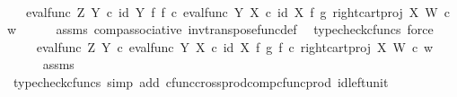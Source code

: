 \begin{isabellebody}
\ \ \isamarkupfalse%
\ \isamarkupfalse%
\ {\isachardoublequoteopen}{\isachardot}{\kern0pt}{\isachardot}{\kern0pt}{\isachardot}{\kern0pt}\ {\isacharequal}{\kern0pt}\ {\isacharparenleft}{\kern0pt}eval{\isacharunderscore}{\kern0pt}func\ Z\ Y\ {\isasymcirc}\isactrlsub c\ {\isacharparenleft}{\kern0pt}id\ Y\ {\isasymtimes}\isactrlsub f\ f{\isacharparenright}{\kern0pt}\ {\isasymcirc}\isactrlsub c\ {\isasymlangle}eval{\isacharunderscore}{\kern0pt}func\ Y\ X\ {\isasymcirc}\isactrlsub c\ {\isacharparenleft}{\kern0pt}id\ X\ {\isasymtimes}\isactrlsub f\ g{\isacharparenright}{\kern0pt}{\isacharcomma}{\kern0pt}\ right{\isacharunderscore}{\kern0pt}cart{\isacharunderscore}{\kern0pt}proj\ X\ W{\isasymrangle}{\isacharparenright}{\kern0pt}\isactrlsup {\isasymsharp}\ {\isasymcirc}\isactrlsub c\ w{\isachardoublequoteclose}\isanewline
\ \ \ \ \isamarkupfalse%
\ assms\ comp{\isacharunderscore}{\kern0pt}associative{}\ inv{\isacharunderscore}{\kern0pt}transpose{\isacharunderscore}{\kern0pt}func{\isacharunderscore}{\kern0pt}def{}\ \isamarkupfalse%
\ {\isacharparenleft}{\kern0pt}typecheck{\isacharunderscore}{\kern0pt}cfuncs{\isacharcomma}{\kern0pt}\ force{\isacharparenright}{\kern0pt}\isanewline
\ \ \isamarkupfalse%
\ \isamarkupfalse%
\ {\isachardoublequoteopen}{\isachardot}{\kern0pt}{\isachardot}{\kern0pt}{\isachardot}{\kern0pt}\ {\isacharequal}{\kern0pt}\ {\isacharparenleft}{\kern0pt}eval{\isacharunderscore}{\kern0pt}func\ Z\ Y\ {\isasymcirc}\isactrlsub c\ {\isasymlangle}eval{\isacharunderscore}{\kern0pt}func\ Y\ X\ {\isasymcirc}\isactrlsub c\ {\isacharparenleft}{\kern0pt}id\ X\ {\isasymtimes}\isactrlsub f\ g{\isacharparenright}{\kern0pt}{\isacharcomma}{\kern0pt}\ f\ {\isasymcirc}\isactrlsub c\ right{\isacharunderscore}{\kern0pt}cart{\isacharunderscore}{\kern0pt}proj\ X\ W{\isasymrangle}{\isacharparenright}{\kern0pt}\isactrlsup {\isasymsharp}\ {\isasymcirc}\isactrlsub c\ w{\isachardoublequoteclose}\isanewline
\ \ \ \ \isamarkupfalse%
\ assms\ \isamarkupfalse%
\ {\isacharparenleft}{\kern0pt}typecheck{\isacharunderscore}{\kern0pt}cfuncs{\isacharcomma}{\kern0pt}\ simp\ add{\isacharcolon}{\kern0pt}\ cfunc{\isacharunderscore}{\kern0pt}cross{\isacharunderscore}{\kern0pt}prod{\isacharunderscore}{\kern0pt}comp{\isacharunderscore}{\kern0pt}cfunc{\isacharunderscore}{\kern0pt}prod\ id{\isacharunderscore}{\kern0pt}left{\isacharunderscore}{\kern0pt}unit{}{\isacharparenright}{\kern0pt}\isanewline
\ \ \isamarkupfalse%

\end{isabellebody}

